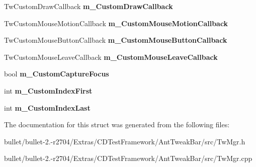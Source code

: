 \begin{DoxyCompactItemize}
\item 
\hypertarget{struct_c_tw_mgr_1_1_c_struct_proxy_a629799225e8e27f7cdb085ef688ebe2b}{Tw\+Custom\+Draw\+Callback {\bfseries m\+\_\+\+Custom\+Draw\+Callback}}\label{struct_c_tw_mgr_1_1_c_struct_proxy_a629799225e8e27f7cdb085ef688ebe2b}

\item 
\hypertarget{struct_c_tw_mgr_1_1_c_struct_proxy_a0e619aa5a0502577887203a1731f700a}{Tw\+Custom\+Mouse\+Motion\+Callback {\bfseries m\+\_\+\+Custom\+Mouse\+Motion\+Callback}}\label{struct_c_tw_mgr_1_1_c_struct_proxy_a0e619aa5a0502577887203a1731f700a}

\item 
\hypertarget{struct_c_tw_mgr_1_1_c_struct_proxy_ae947e4bed53f251654f46ad97d3cd26a}{Tw\+Custom\+Mouse\+Button\+Callback {\bfseries m\+\_\+\+Custom\+Mouse\+Button\+Callback}}\label{struct_c_tw_mgr_1_1_c_struct_proxy_ae947e4bed53f251654f46ad97d3cd26a}

\item 
\hypertarget{struct_c_tw_mgr_1_1_c_struct_proxy_a7784e5d2886ce368e57df66df31167b1}{Tw\+Custom\+Mouse\+Leave\+Callback {\bfseries m\+\_\+\+Custom\+Mouse\+Leave\+Callback}}\label{struct_c_tw_mgr_1_1_c_struct_proxy_a7784e5d2886ce368e57df66df31167b1}

\item 
\hypertarget{struct_c_tw_mgr_1_1_c_struct_proxy_a5510f95fa1553b857e672c024bfb035e}{bool {\bfseries m\+\_\+\+Custom\+Capture\+Focus}}\label{struct_c_tw_mgr_1_1_c_struct_proxy_a5510f95fa1553b857e672c024bfb035e}

\item 
\hypertarget{struct_c_tw_mgr_1_1_c_struct_proxy_a93ae9101d8a9bc3dd7b08dc8eecd65b4}{int {\bfseries m\+\_\+\+Custom\+Index\+First}}\label{struct_c_tw_mgr_1_1_c_struct_proxy_a93ae9101d8a9bc3dd7b08dc8eecd65b4}

\item 
\hypertarget{struct_c_tw_mgr_1_1_c_struct_proxy_a30e1c059f7ac4b91d37a8e85825ab01d}{int {\bfseries m\+\_\+\+Custom\+Index\+Last}}\label{struct_c_tw_mgr_1_1_c_struct_proxy_a30e1c059f7ac4b91d37a8e85825ab01d}

\end{DoxyCompactItemize}


The documentation for this struct was generated from the following files\+:\begin{DoxyCompactItemize}
\item 
bullet/bullet-\/2.-\/r2704/\+Extras/\+C\+D\+Test\+Framework/\+Ant\+Tweak\+Bar/src/Tw\+Mgr.\+h\item 
bullet/bullet-\/2.-\/r2704/\+Extras/\+C\+D\+Test\+Framework/\+Ant\+Tweak\+Bar/src/Tw\+Mgr.\+cpp\end{DoxyCompactItemize}

